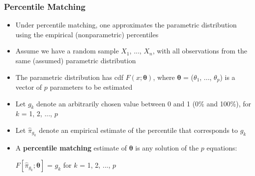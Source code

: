 \documentclass{beamer}
\begin{document}
\begin{frame}[shrink=2]
\frametitle{Percentile Matching}
\begin{itemize}
\item Under percentile matching, one approximates the parametric distribution using the empirical (nonparametric) percentiles \vspace{2mm}

\item Assume we have a random sample $X_1$, ..., $X_n$, with all observations from the
same (assumed) parametric distribution \vspace{2mm}

\item The parametric distribution has cdf $F(x;\mathbf{\theta})$, where $\mathbf{\theta}$ = ($\theta_1$, ..., $\theta_p$) is
a vector of $p$ parameters to be estimated \vspace{2mm}

\item Let $g_k$ denote an arbitrarily chosen value between 0 and 1 (0\% and 100\%), for $k$ =
1, 2, ..., $p$ \vspace{2mm}

\item Let $\hat{\pi}_{g_k}$ denote an empirical estimate of the percentile that corresponds to
$g_k$ \vspace{2mm}

\item A \textbf{percentile matching} estimate of $\mathbf{\theta}$ is any
solution of the $p$ equations: \vspace{2mm}

\hspace{1in} $F[\hat{\pi}_{g_k};\mathbf{\theta}]$ = $g_k$ for $k$ =
1, 2, ..., $p$ \vspace{2mm}
\end{itemize}
\end{frame}
\end{document}
